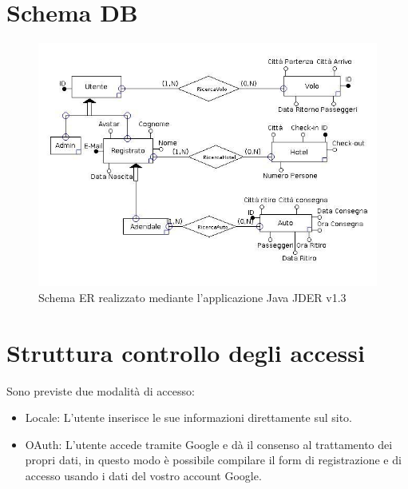 \documentclass[11pt]{article}
\begin{document}
\section{Schema DB}
\begin{figure}[!ht]
	\includegraphics[width=1.2\textwidth]{progetto} %
	\caption{Schema ER realizzato mediante l'applicazione Java JDER v1.3}
	\label{fig:schemaer}
\end{figure}


\section{Struttura controllo degli accessi}
Sono previste due modalità di accesso:
\begin{itemize}
	\item Locale: L’utente inserisce le sue informazioni direttamente sul sito.
	\item OAuth: L’utente accede tramite Google e dà il consenso al trattamento dei propri dati, in questo modo è possibile compilare il form di registrazione e di accesso usando i dati del vostro account Google.
\end{itemize}
\end{document}
